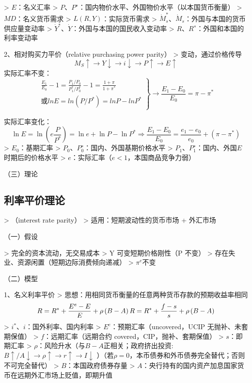 \documentclass[12pt]{book}
\begin{document}
> $E$：名义汇率  
> $P$、$P^∗$：国内物价水平、外国物价水平（以本国货币衡量）  
> $MD$：名义货币需求  
> $L(R,Y)$：实际货币需求  
> ${\dot{M}}_s^\ast$、${\dot{M}}_s$：外国与本国的货币供应量变动率  
> $\dot{Y}^∗$、$\dot{Y}$：外国与本国的国民收入变动率  
> $R$、$R^{∗}$：外国和本国的利率变动率


2、相对购买力平价（relative purchasing power parity）
> 变动，通过价格传导
$$ 
M_S\uparrow\rightarrow Y\downarrow\rightarrow i\downarrow\rightarrow P\uparrow\rightarrow E\uparrow 
$$
实际汇率不变：
$$
\left.\begin{matrix}
  \frac{E_1}{E_0}-1 = \frac{P_1/P_0}{P_1^*/P_0^*} -1=\frac{1+\pi}{1+\pi^{*}} \\
或 lnE=ln(P/P^{*}) = lnP-lnP^{*}
\end{matrix}\right\}
→\frac{E_1-E_0}{E_0} = \pi-\pi^{*}
$$

实际汇率变化：
$$
  \ln{E}=\ln{\left(e\frac{P}{P^\ast}\right)}=\ln{e}+\ln{P}-\ln{P^\ast}\Rightarrow\frac{E_1-E_0}{E_0}=\frac{e_1-e_0}{e_0}+\left(\pi-\pi^\ast\right)
$$
> $E_0$：基期汇率  
> $P_0$、$P_0^∗$：国内、外国基期价格水平  
> $P_1$、$P_1^∗$：国内、外国$E$时期后的价格水平   
> $e$：实际汇率（$e < 1$，本国商品竞争力弱）


（三）理论



\subsection{利率平价理论}

> （interest rate parity）  
> 适用：短期波动性的货币市场 + 外汇市场


（一）假设

> 完全的资本流动，无交易成本  
> Y 可变短期价格刚性（P 不变）  
> 存在失业、资源闲置（短期边际消费倾向递减）  
> $\pi^e$不变  


（二）模型

1、名义利率平价
> 思想：用相同货币衡量的任意两种货币存款的预期收益率相同
$$
R = R^\ast+\frac{E^e-E}{E}+\rho\left(B-A\right) \\
R = R^\ast+\frac{f-s}{s}+\rho\left(B-A\right)
$$
> $i^\ast$、$i$：国外利率、国内利率  
> $E^e$：预期汇率（uncovered，UCIP 无抛补、未套期保值）  
> $f$：远期汇率（远期合约 covered，CIP，抛补、套期保值）  
> $s$：即期汇率  
> $\rho$：风险升水（与$B−A$正相关；政府挤出投资: $B↑/A↓→\rho ↑ →r↑→I↓$ ）（若$\rho =0$，本币债券和外币债券完全替代；否则不可完全替代）  
> $B$：本国政府债券存量   
> $A$：央行持有的国内资产加息国家货币在远期外汇市场上贬值，即期升值
\end{document}
